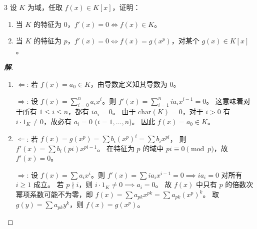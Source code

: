 \documentclass[12pt, a4paper]{article}
\newenvironment{solution}{
    \begin{proof}[\textbf{解}]
}{
    \end{proof}
}
\begin{document}
\begin{problem}{3}
    设 $K$ 为域，任取 $f(x) \in K[x]$，证明：
    \begin{enumerate}[(1)]
        \item 当 $K$ 的特征为 $0$，$f'(x)=0 \iff f(x) \in K$。
        \item 当 $K$ 的特征为 $p$，$f'(x)=0 \iff f(x)=g(x^p)$，对某个 $g(x) \in K[x]$。
    \end{enumerate}
\end{problem}
\begin{solution}
    \begin{enumerate}
        \item[(1)] $\Longleftarrow$: 若 $f(x) = a_0 \in K$，由导数定义知其导数为 $0$。
        
        $\Longrightarrow$: 设 $f(x) = \sum_{i=0}^n a_i x^i$。则 $f'(x) = \sum_{i=1}^n ia_i x^{i-1} = 0$。
        这意味着对于所有 $1 \le i \le n$，都有 $ia_i = 0$。
        由于 $\text{char}(K) = 0$，对于 $i > 0$ 有 $i \cdot 1_K \neq 0$，故必有 $a_i = 0$ ($i=1,\dots,n$)。
        因此 $f(x) = a_0 \in K$。
        
        \item[(2)] $\Longleftarrow$: 若 $f(x) = g(x^p) = \sum b_i (x^p)^i = \sum b_i x^{pi}$，
        则 $f'(x) = \sum b_i (pi) x^{pi-1}$。
        在特征为 $p$ 的域中 $pi \equiv 0 \pmod p$，故 $f'(x) = 0$。
        
        $\Longrightarrow$: 设 $f(x) = \sum a_i x^i$。则 $f'(x) = \sum ia_i x^{i-1} = 0 \implies ia_i = 0$ 对所有 $i \ge 1$ 成立。
        若 $p \nmid i$，则 $i \cdot 1_K \neq 0 \implies a_i = 0$。
        故 $f(x)$ 中只有 $p$ 的倍数次幂项系数可能不为零，即 $f(x) = \sum a_{pk} x^{pk} = \sum a_{pk} (x^p)^k$。
        取 $g(y) = \sum a_{pk} y^k$，则 $f(x) = g(x^p)$。
    \end{enumerate}
\end{solution}
    
\end{document}
